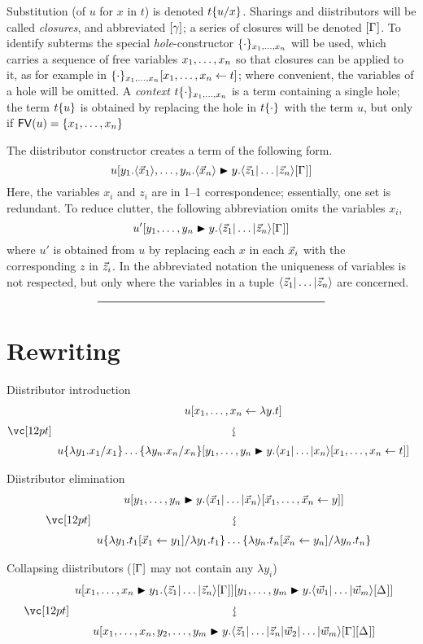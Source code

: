 \documentclass{amsart}
\begin{document}
Substitution (of $u$ for $x$ in $t$) is denoted $t\sub xu$.
%
Sharings and diistributors will be called \emph{closures}, and abbreviated $\g$; a series of closures will be denoted $\G$.
%
To identify subterms the special \emph{hole}-constructor $\cxt[\vv x]$ will be used, which carries a sequence of free variables $\vv x$ so that closures can be applied to it, as for example in $\cxt[\vv x]\share xt$; where convenient, the variables of a hole will be omitted.
%
A \emph{context} $t\cxt[\vv x]$ is a term containing a single hole; the term $t\cxt*u$ is obtained by replacing the hole in $t\cxt$ with the term $u$, but only if $\FV(u)=\{\vv x\}$



The diistributor constructor creates a term of the following form.
\[
	u\diistr*{y_1.\tup*{\vv*x_1},\ldots,y_n.\tup*{\vv*x_n}}y{\ttup*z\G}
\]
Here, the variables $x_i$ and $z_i$ are in 1--1 correspondence; essentially, one set is redundant.
%
To reduce clutter, the following abbreviation omits the variables $x_i$,
\[
	u'\diistr yy{\ttup*z\G}
\]
where $u'$ is obtained from $u$ by replacing each $x$ in each $\vv*x_i$ with the corresponding $z$ in $\vv*z_i$.
%
In the abbreviated notation the uniqueness of variables is not respected, but only where the variables in a tuple $\ttup*z$ are concerned.


\[
	\rule{200pt}{.5pt}
\]


\section*{Rewriting}

\noindent
Diistributor introduction
\[
\displayrewrite
  { u\share x{\lambda y.t} }
  { u\subsabs xyx\diistr yy{\ttup x\share xt} }
\]

\bigskip
\bigskip
\bigskip

\noindent
Diistributor elimination
\[
\displayrewrite
  { u\diistr yy{\ttup*x\share{\vv*x}y} }
  { u\sub{\lambda y_1.t_1}{\lambda y_1.t_1\share*{\vv*x_1}{y_1}} \dotso
     \sub{\lambda y_n.t_n}{\lambda y_n.t_n\share*{\vv*x_n}{y_n}} }
\]

\bigskip
\bigskip
\bigskip

\noindent
Collapsing diistributors ($\G$ may not contain any $\lambda y_i$)
\[
\displayrewrite
  { u\diistr x{y_1}{\ttup*z\G}\diistr[m]yy{\ttup*[m]w\G*} }
  { u\diistr*{\vv x,y_2,\dotsc,y_m}y{\tup*{\vv*z_1|\dotso|\vv*z_n|\vv*w_2|\dotso|\vv*w_m}\G\G*} }
\]
\end{document}
